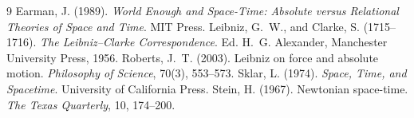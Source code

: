 \documentclass{situationist-preprint}
\begin{document}
\begin{thebibliography}{9}
 Earman, J. (1989). \emph{World Enough and Space-Time: Absolute versus Relational Theories of Space and Time}. MIT Press.
 Leibniz, G.~W., and Clarke, S. (1715--1716). \emph{The Leibniz--Clarke Correspondence}. Ed. H.~G. Alexander, Manchester University Press, 1956.
 Roberts, J.~T. (2003). Leibniz on force and absolute motion. \emph{Philosophy of Science}, 70(3), 553--573.
 Sklar, L. (1974). \emph{Space, Time, and Spacetime}. University of California Press.
 Stein, H. (1967). Newtonian space-time. \emph{The Texas Quarterly}, 10, 174--200.
\end{thebibliography}
\end{document}
